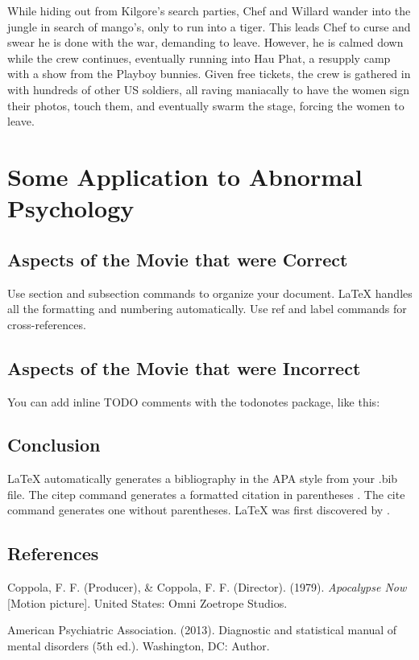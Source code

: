 \documentclass[a4paper,man,natbib]{apa6}
\begin{document}
While hiding out from Kilgore's search parties, Chef and Willard wander into the jungle in search of mango's, only to run into a tiger. This leads Chef to curse and swear he is done with the war, demanding to leave. However, he is calmed down while the crew continues, eventually running into Hau Phat, a resupply camp with a show from the Playboy bunnies. Given free tickets, the crew is gathered in with hundreds of other US soldiers, all raving maniacally to have the women sign their photos, touch them, and eventually swarm the stage, forcing the women to leave.



\section{Some Application to Abnormal Psychology}
\label{sec:examples}

\subsection{Aspects of the Movie that were Correct}

Use section and subsection commands to organize your document. \LaTeX{} handles all the formatting and numbering automatically. Use ref and label commands for cross-references.

\subsection{Aspects of the Movie that were Incorrect}

You can add inline TODO comments with the todonotes package, like this:

\subsection{Conclusion}

LaTeX automatically generates a bibliography in the APA style from your .bib file. The citep command generates a formatted citation in parentheses \citep{Lamport1986}. The cite command generates one without parentheses. LaTeX was first discovered by \cite{Lamport1986}.

\pagebreak
\maketitle

\subsection{References}
Coppola, F. F. (Producer), \& Coppola, F. F. (Director). (1979). \textit{Apocalypse Now} [Motion picture]. United States: Omni Zoetrope Studios.

American Psychiatric Association. (2013). Diagnostic and statistical manual of mental disorders (5th ed.). Washington, DC: Author.
\end{document}
